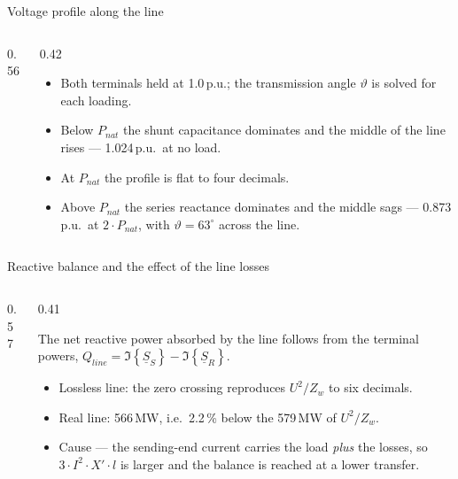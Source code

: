 \begin{frame}{Voltage profile along the line}
  \begin{columns}[c,onlytextwidth]
    \begin{column}{0.56\textwidth}\centering
    \end{column}
    \begin{column}{0.42\textwidth}
      {\small
      \begin{itemize}
        \setlength{\itemsep}{0.4em}
        \item Both terminals held at 1.0\,p.u.; the transmission angle
              $\vartheta$ is solved for each loading.
        \item Below $P_{nat}$ the shunt capacitance dominates and the middle
              of the line rises --- 1.024\,p.u.\ at no load.
        \item At $P_{nat}$ the profile is flat to four decimals.
        \item Above $P_{nat}$ the series reactance dominates and the middle
              sags --- 0.873\,p.u.\ at $2\cdot P_{nat}$, with
              $\vartheta=63^\circ$ across the line.
      \end{itemize}}
    \end{column}
  \end{columns}
\end{frame}

\begin{frame}{Reactive balance and the effect of the line losses}
  \begin{columns}[c,onlytextwidth]
    \begin{column}{0.57\textwidth}\centering
    \end{column}
    \begin{column}{0.41\textwidth}
      {\small The net reactive power absorbed by the line follows from the
      terminal powers,
      $Q_{line}=\Im\!\left\{\underline{S}_S\right\}-\Im\!\left\{\underline{S}_R\right\}$.
      \begin{itemize}
        \setlength{\itemsep}{0.35em}
        \item Lossless line: the zero crossing reproduces $U^2/Z_w$ to six
              decimals.
        \item Real line: 566\,MW, i.e.\ 2.2\,\% below the 579\,MW of
              $U^2/Z_w$.
        \item Cause --- the sending-end current carries the load \emph{plus}
              the losses, so $3\cdot I^2\cdot X'\cdot l$ is larger and the
              balance is reached at a lower transfer.
      \end{itemize}}
    \end{column}
  \end{columns}
\end{frame}

